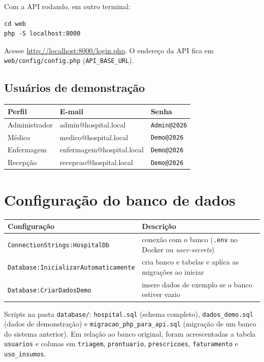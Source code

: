 \documentclass[12pt,a4paper]{article}
\newcommand{\cod}[1]{\texttt{#1}}
\begin{document}
Com a API rodando, em outro terminal:

\begin{lstlisting}
cd web
php -S localhost:8000
\end{lstlisting}

Acesse \url{http://localhost:8000/login.php}. O endereço da API fica em
\cod{web/config/config.php} (\cod{API\_BASE\_URL}).

\subsection{Usuários de demonstração}\label{sec:usuarios}

\begin{tabularx}{\textwidth}{@{}llL@{}}
\toprule
\textbf{Perfil} & \textbf{E-mail} & \textbf{Senha} \\
\midrule
Administrador & admin@hospital.local      & \cod{Admin@2026} \\
Médico        & medico@hospital.local     & \cod{Demo@2026} \\
Enfermagem    & enfermagem@hospital.local & \cod{Demo@2026} \\
Recepção      & recepcao@hospital.local   & \cod{Demo@2026} \\
\bottomrule
\end{tabularx}

\section{Configuração do banco de dados}

\begin{tabularx}{\textwidth}{@{}lL@{}}
\toprule
\textbf{Configuração} & \textbf{Descrição} \\
\midrule
\cod{ConnectionStrings:HospitalDb}        & conexão com o banco (\cod{.env} no Docker ou \textit{user-secrets}) \\
\cod{Database:InicializarAutomaticamente} & cria banco e tabelas e aplica as migrações ao iniciar \\
\cod{Database:CriarDadosDemo}             & insere dados de exemplo se o banco estiver vazio \\
\bottomrule
\end{tabularx}

\medskip
Scripts na pasta \cod{database/}: \cod{hospital.sql} (schema completo), \cod{dados\_demo.sql}
(dados de demonstração) e \cod{migracao\_php\_para\_api.sql} (migração de um banco do sistema
anterior). Em relação ao banco original, foram acrescentadas a tabela \cod{usuarios} e colunas
em \cod{triagem}, \cod{prontuario}, \cod{prescricoes}, \cod{faturamento} e \cod{uso\_insumos}.
\end{document}
